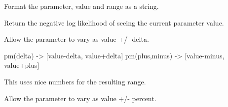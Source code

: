 \documentclass[letterpaper,10pt,english]{sphinxmanual}
\begin{document}
\begin{fulllineitems}
\begin{fulllineitems}
\end{fulllineitems}


\begin{fulllineitems}
\label{api/mystic.parameter:refl1d.mystic.parameter.VectorParameter.format}
Format the parameter, value and range as a string.

\end{fulllineitems}


\begin{fulllineitems}
\label{api/mystic.parameter:refl1d.mystic.parameter.VectorParameter.nllf}
Return the negative log likelihood of seeing the current parameter value.

\end{fulllineitems}


\begin{fulllineitems}
\label{api/mystic.parameter:refl1d.mystic.parameter.VectorParameter.parameters}
\end{fulllineitems}


\begin{fulllineitems}
\label{api/mystic.parameter:refl1d.mystic.parameter.VectorParameter.pm}
Allow the parameter to vary as value +/- delta.

pm(delta) -\textgreater{} {[}value-delta, value+delta{]}
pm(plus,minus) -\textgreater{} {[}value-minus, value+plus{]}

This uses nice numbers for the resulting range.

\end{fulllineitems}


\begin{fulllineitems}
\label{api/mystic.parameter:refl1d.mystic.parameter.VectorParameter.pmp}
Allow the parameter to vary as value +/- percent.


\end{fulllineitems}
\end{fulllineitems}
\end{document}
